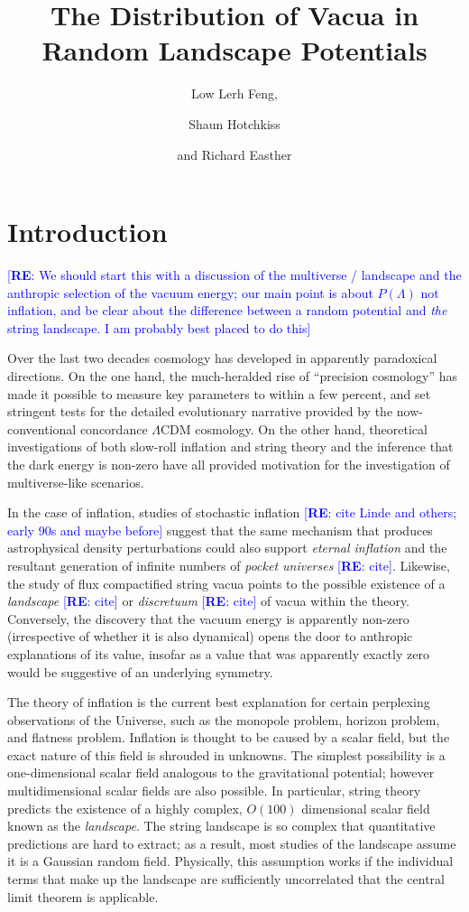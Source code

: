 \documentclass[12pt]{article}
\title{The Distribution of Vacua in Random Landscape Potentials}
\author{Low Lerh Feng,}
\author{Shaun Hotchkiss}
\author{and Richard Easther}
\affiliation{Department of Physics,\\ University of Auckland, \\Private Bag 92019,\\ Auckland, New Zealand}
\newcommand{\re}[1]{\textcolor{blue}{[{\bf RE}: #1]}}
\begin{document}
\maketitle

\section{Introduction}

\re{We should start this with a discussion of the multiverse / landscape and the anthropic selection of the vacuum energy; our main point is about $P(\Lambda)$ not inflation, and be clear about the difference between a random potential and {\em the} string landscape. I am probably best placed to do this} 

Over the last two decades cosmology has developed in apparently paradoxical directions. On the one hand, the much-heralded rise of ``precision cosmology'' has made it possible to measure key parameters to within a few percent, and set stringent tests for the detailed evolutionary narrative provided by the now-conventional concordance $\Lambda$CDM cosmology. On the other hand, theoretical investigations of both slow-roll inflation and string theory and the inference that the dark energy is non-zero have all provided motivation for the investigation of multiverse-like scenarios. 

In the case of inflation, studies of stochastic inflation \re{cite Linde and others; early 90s and maybe before}  suggest that the same mechanism that produces astrophysical density perturbations could also support {\em eternal inflation\/} and the resultant generation of infinite numbers of  {\em pocket universes\/} \re{cite}. Likewise, the study of flux compactified string vacua points to the possible existence of a {\em landscape\/} \re{cite} or {\em discretuum\/} \re{cite}  of vacua within the theory. Conversely, the discovery that the vacuum energy is apparently non-zero (irrespective of whether it is also dynamical) opens the door to anthropic explanations of its value, insofar as a value that was apparently exactly zero would be suggestive of an underlying symmetry. 

 

The theory of inflation is the current best explanation for certain perplexing observations of the Universe, such as the monopole problem, horizon problem, and flatness problem. Inflation is thought to be caused by a scalar field, but the exact nature of this field is shrouded in unknowns. The simplest possibility is a one-dimensional scalar field analogous to the gravitational potential; however multidimensional scalar fields are also possible. In particular, string theory predicts the existence of a highly complex, $O(100)$ dimensional scalar field known as the \emph{landscape}. The string landscape is so complex that quantitative predictions are hard to extract; as a result, most studies of the landscape assume it is a Gaussian random field.\cite{GRF1, GRF2, GRF3} Physically, this assumption works if the individual terms that make up the landscape are sufficiently uncorrelated that the central limit theorem is applicable.
\end{document}
